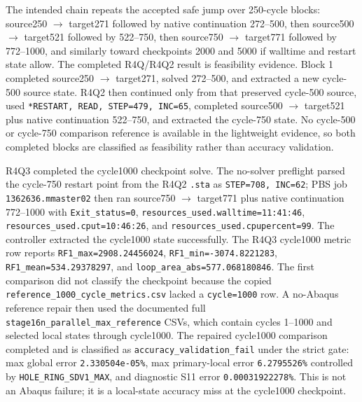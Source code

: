 \documentclass{article}
\begin{document}
The intended chain repeats the accepted safe jump over 250-cycle blocks: source250 \(\rightarrow\) target271 followed by native continuation 272--500, then source500 \(\rightarrow\) target521 followed by 522--750, then source750 \(\rightarrow\) target771 followed by 772--1000, and similarly toward checkpoints 2000 and 5000 if walltime and restart state allow. The completed R4Q/R4Q2 result is feasibility evidence. Block 1 completed source250 \(\rightarrow\) target271, solved 272--500, and extracted a new cycle-500 source state. R4Q2 then continued only from that preserved cycle-500 source, used \texttt{*RESTART, READ, STEP=479, INC=65}, completed source500 \(\rightarrow\) target521 plus native continuation 522--750, and extracted the cycle-750 state. No cycle-500 or cycle-750 comparison reference is available in the lightweight evidence, so both completed blocks are classified as feasibility rather than accuracy validation.

R4Q3 completed the cycle1000 checkpoint solve. The no-solver preflight parsed the cycle-750 restart point from the R4Q2 \texttt{.sta} as \texttt{STEP=708, INC=62}; PBS job \texttt{1362636.mmaster02} then ran source750 \(\rightarrow\) target771 plus native continuation 772--1000 with \texttt{Exit\_status=0}, \texttt{resources\_used.walltime=11:41:46}, \texttt{resources\_used.cput=10:46:26}, and \texttt{resources\_used.cpupercent=99}. The controller extracted the cycle1000 state successfully. The R4Q3 cycle1000 metric row reports \texttt{RF1\_max=2908.24456024}, \texttt{RF1\_min=-3074.8221283}, \texttt{RF1\_mean=534.29378297}, and \texttt{loop\_area\_abs=577.068180846}. The first comparison did not classify the checkpoint because the copied \texttt{reference\_1000\_cycle\_metrics.csv} lacked a \texttt{cycle=1000} row. A no-Abaqus reference repair then used the documented full \texttt{stage16n\_parallel\_max\_reference} CSVs, which contain cycles 1--1000 and selected local states through cycle1000. The repaired cycle1000 comparison completed and is classified as \texttt{accuracy\_validation\_fail} under the strict gate: max global error \texttt{2.330504e-05\%}, max primary-local error \texttt{6.2795526\%} controlled by \texttt{HOLE\_RING\_SDV1\_MAX}, and diagnostic S11 error \texttt{0.00031922278\%}. This is not an Abaqus failure; it is a local-state accuracy miss at the cycle1000 checkpoint.
\end{document}
